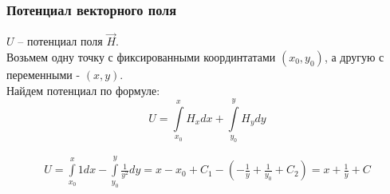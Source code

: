\begin{frame}\frametitle{Потенциал векторного поля}
	\(U\) -- потенциал поля \(\vec H\). \\
	Возьмем одну точку с фиксированными координтатами
	$(x_0, y_0)$, а другую с переменными - $(x, y)$. \\
	Найдем потенциал по формуле:
	\begin{equation}
		U =
		\int\limits_{x_0}^{x} H_xdx + \int\limits_{y_0}^{y} H_ydy
		\label{eq:u_integral}
	\end{equation}

	\begin{align*}
		U =
		\int\limits_{x_0}^{x} 1dx -
		\int\limits_{y_0}^{y} \frac{1}{y^2} dy = 
		x - x_0 + C_1 - (-\frac{1}{y} + \frac{1}{y_0} + C_2) =
		x + \frac{1}{y} + C
	\end{align*}
	

\end{frame}